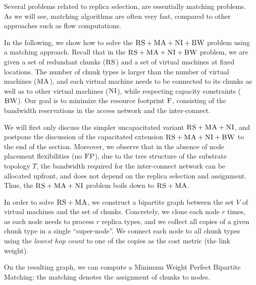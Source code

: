 \documentclass[9pt,twocolumn]{scrartcl}
\newcommand{\MaFactor}{r}
\newcommand{\ChunkType}{\tau}
\newcommand{\VirtualNodes}{\ensuremath{V}}
\newcommand{\CC}{\textsc{NI}}
\newcommand{\FP}{\textsc{FP}}
\newcommand{\RS}{\textsc{RS}}
\newcommand{\BW}{\textsc{BW}}
\newcommand{\MA}{\textsc{MA}}
\newcommand{\Cost}{\textsc{F}}
\newcommand{\Tree}{\ensuremath{T}}
\begin{document}
Several problems related to replica selection,
are essentially matching problems. As we will see,
matching algorithms are often very fast, compared
to other approaches such as flow computations.

In the following, we show how to solve
the $\RS+\MA+\CC+\BW$ problem using a matching approach.
Recall that in the $\RS+\MA+\CC+\BW$ problem,
we are given a set of redundant chunks ($\RS$) and a set of virtual machines
at fixed locations. The number of chunk types is larger than the number
of virtual machines ($\MA$), and each virtual machine needs to be connected
to its chunks as well as to other virtual machines ($\CC$), while respecting
capacity constraints ($\BW$).
Our goal is to minimize the resource footprint $\Cost$, consisting
of the bandwidth reservations in the access network and the inter-connect.

We will first only discuss the simpler uncapacitated variant $\RS+\MA+\CC$, and postpone
the discussion of the capacitated extension $\RS+\MA+\CC+\BW$ to the end of the section.
Moreover, we observe that in the absence of node placement flexibilities (no $\FP$),
due to the tree structure of the substrate topology $\Tree$, the bandwidth required
for the inter-connect network can be allocated upfront, and does not depend on the replica
selection and assignment. Thus, the $\RS+\MA+\CC$ problem boils down to $\RS+\MA$.

In order to solve $\RS+\MA$, we construct a bipartite graph between the set
$\VirtualNodes$ of virtual machines and
the set of chunks.
Concretely, we clone each node $\MaFactor$ times,
as each node needs to process
$\MaFactor$ replica types, and we collect all copies of a given chunk type in a
single %
``super-node''. We connect each node to all chunk types using the
\emph{lowest hop count} to one of the copies as the cost metric (the link weight).

On the resulting graph, we can compute a Minimum Weight
Perfect Bipartite
Matching:
the matching denotes the assignment of chunks to nodes.
\end{document}
